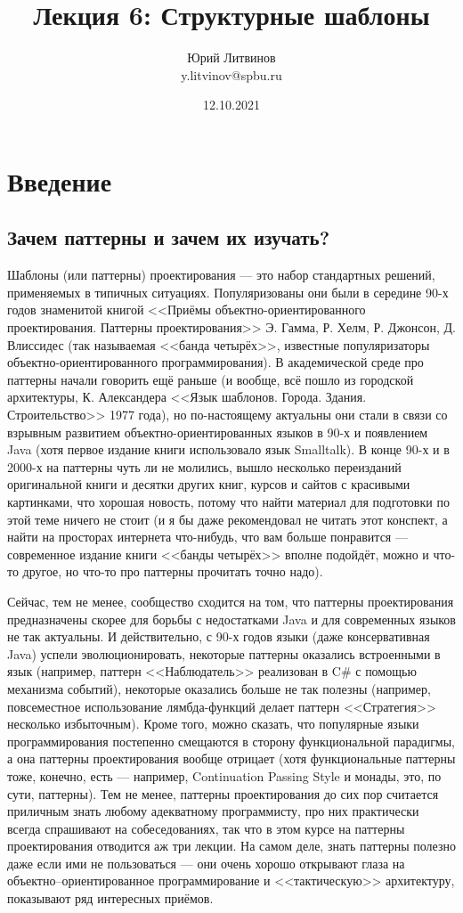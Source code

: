 \documentclass[a5paper]{article}
\title{Лекция 6: Структурные шаблоны}
\author{Юрий Литвинов\\\small{y.litvinov@spbu.ru}}
\date{12.10.2021}
\begin{document}
\maketitle
\thispagestyle{empty}

\section{Введение}

\subsection{Зачем паттерны и зачем их изучать?}

Шаблоны (или паттерны) проектирования --- это набор стандартных решений, применяемых в типичных ситуациях. Популяризованы они были в середине 90-х годов знаменитой книгой <<Приёмы объектно-ориентированного проектирования. Паттерны проектирования>> Э. Гамма, Р. Хелм, Р. Джонсон, Д. Влиссидес (так называемая <<банда четырёх>>, известные популяризаторы объектно-ориентированного программирования). В академической среде про паттерны начали говорить ещё раньше (и вообще, всё пошло из городской архитектуры, К. Александера <<Язык шаблонов. Города. Здания. Строительство>> 1977 года), но по-настоящему актуальны они стали в связи со взрывным развитием объектно-ориентированных языков в 90-х и появлением Java (хотя первое издание книги использовало язык Smalltalk). В конце 90-х и в 2000-х на паттерны чуть ли не молились, вышло несколько переизданий оригинальной книги и десятки других книг, курсов и сайтов с красивыми картинками, что хорошая новость, потому что найти материал для подготовки по этой теме ничего не стоит (и я бы даже рекомендовал не читать этот конспект, а найти на просторах интернета что-нибудь, что вам больше понравится --- современное издание книги <<банды четырёх>> вполне подойдёт, можно и что-то другое, но что-то про паттерны прочитать точно надо). 

Сейчас, тем не менее, сообщество сходится на том, что паттерны проектирования предназначены скорее для борьбы с недостатками Java и для современных языков не так актуальны. И действительно, с 90-х годов языки (даже консервативная Java) успели эволюционировать, некоторые паттерны оказались встроенными в язык (например, паттерн <<Наблюдатель>> реализован в C\# с помощью механизма событий), некоторые оказались больше не так полезны (например, повсеместное использование лямбда-функций делает паттерн <<Стратегия>> несколько избыточным). Кроме того, можно сказать, что популярные языки программирования постепенно смещаются в сторону функциональной парадигмы, а она паттерны проектирования вообще отрицает (хотя функциональные паттерны тоже, конечно, есть --- например, Continuation Passing Style и монады, это, по сути, паттерны). Тем не менее, паттерны проектирования до сих пор считается приличным знать любому адекватному программисту, про них практически всегда спрашивают на собеседованиях, так что в этом курсе на паттерны проектирования отводится аж три лекции. На самом деле, знать паттерны полезно даже если ими не пользоваться --- они очень хорошо открывают глаза на объектно--ориентированное программирование и <<тактическую>> архитектуру, показывают ряд интересных приёмов.
\end{document}
